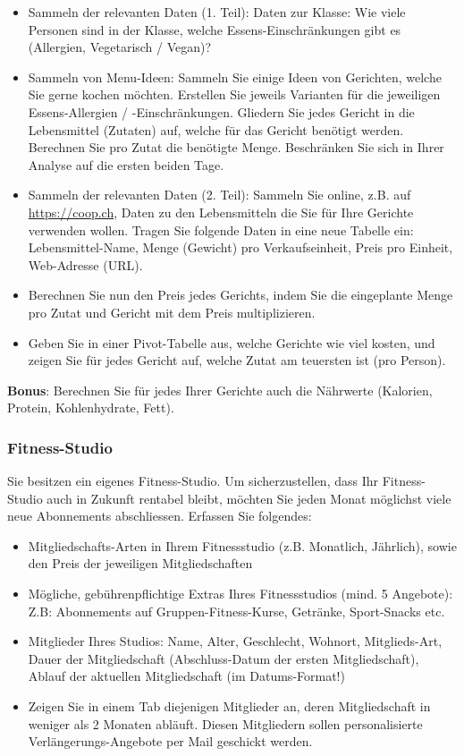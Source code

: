 \begin{itemize}
	\item Sammeln der relevanten Daten (1. Teil): Daten zur Klasse: Wie viele Personen sind in der Klasse, welche Essens-Einschränkungen gibt es (Allergien, Vegetarisch / Vegan)?
	\item Sammeln von Menu-Ideen: Sammeln Sie einige Ideen von Gerichten, welche Sie gerne kochen möchten. Erstellen Sie jeweils Varianten für die jeweiligen Essens-Allergien / -Einschränkungen. Gliedern Sie jedes Gericht in die Lebensmittel (Zutaten) auf, welche für das Gericht benötigt werden. Berechnen Sie pro Zutat die benötigte Menge. Beschränken Sie sich in Ihrer Analyse auf die ersten beiden Tage. 
	\item Sammeln der relevanten Daten (2. Teil): Sammeln Sie online, z.B. auf \url{https://coop.ch}, Daten zu den Lebensmitteln die Sie für Ihre Gerichte verwenden wollen. Tragen Sie folgende Daten in eine neue Tabelle ein: Lebensmittel-Name, Menge (Gewicht) pro Verkaufseinheit, Preis pro Einheit, Web-Adresse (URL).
	\item Berechnen Sie nun den Preis jedes Gerichts, indem Sie die eingeplante Menge pro Zutat und Gericht mit dem Preis multiplizieren. 
	\item Geben Sie in einer Pivot-Tabelle aus, welche Gerichte wie viel kosten, und zeigen Sie für jedes Gericht auf, welche Zutat am teuersten ist (pro Person).
\end{itemize}
\textbf{Bonus}: Berechnen Sie für jedes Ihrer Gerichte auch die Nährwerte (Kalorien, Protein, Kohlenhydrate, Fett).

\subsubsection*{Fitness-Studio}
Sie besitzen ein eigenes Fitness-Studio. Um sicherzustellen, dass Ihr Fitness-Studio auch in Zukunft rentabel bleibt, möchten Sie jeden Monat möglichst viele neue Abonnements abschliessen. Erfassen Sie folgendes:

\begin{itemize}
	\item Mitgliedschafts-Arten in Ihrem Fitnessstudio (z.B. Monatlich, Jährlich), sowie den Preis der jeweiligen Mitgliedschaften
	\item Mögliche, gebührenpflichtige Extras Ihres Fitnessstudios (mind. 5 Angebote): Z.B: Abonnements auf Gruppen-Fitness-Kurse, Getränke, Sport-Snacks etc.	
	\item Mitglieder Ihres Studios: Name, Alter, Geschlecht, Wohnort, Mitglieds-Art, Dauer der Mitgliedschaft (Abschluss-Datum der ersten Mitgliedschaft), Ablauf der aktuellen Mitgliedschaft (im Datums-Format!)
	\item Zeigen Sie in einem Tab diejenigen Mitglieder an, deren Mitgliedschaft in weniger als 2 Monaten abläuft. Diesen Mitgliedern sollen personalisierte Verlängerungs-Angebote per Mail geschickt werden.
\end{itemize}

